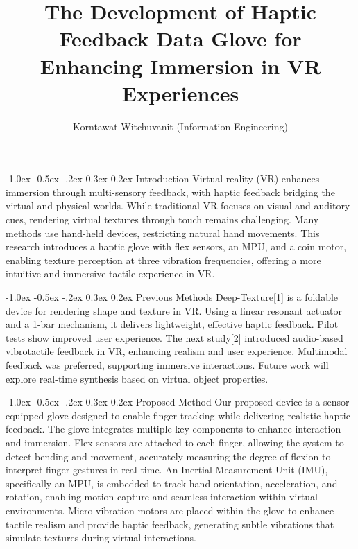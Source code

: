 \documentclass[a4paper,twocolumn]{article}
\title{\textbf{The Development of Haptic Feedback Data Glove for Enhancing Immersion in VR Experiences}}
\author{\small{Korntawat Witchuvanit (Information Engineering)}}
\date{\vspace{-3em}}
\begin{document}
\small
\maketitle

\makeatletter
\renewcommand\section{\@startsection{section}{1}{\z@}%
  {-1.0ex \@plus -0.5ex \@minus -.2ex}%
  {0.3ex \@plus 0.2ex}%
  {\normalfont\small\bfseries}}
\makeatother



\section{Introduction}
Virtual reality (VR) enhances immersion through multi-sensory feedback, with haptic feedback bridging the virtual and physical worlds. While traditional VR focuses on visual and auditory cues, rendering virtual textures through touch remains challenging. Many methods use hand-held devices, restricting natural hand movements. This research introduces a haptic glove with flex sensors, an MPU, and a coin motor, enabling texture perception at three vibration frequencies, offering a more intuitive and immersive tactile experience in VR.

\section{Previous Methods}
Deep-Texture[1] is a foldable device for rendering shape and texture in VR. Using a linear resonant actuator and a 1-bar mechanism, it delivers lightweight, effective haptic feedback. Pilot tests show improved user experience. The next study[2] introduced audio-based vibrotactile feedback in VR, enhancing realism and user experience. Multimodal feedback was preferred, supporting immersive interactions. Future work will explore real-time synthesis based on virtual object properties.

\section{Proposed Method}
Our proposed device is a sensor-equipped glove designed to enable finger tracking while delivering realistic haptic feedback. The glove integrates multiple key components to enhance interaction and immersion. Flex sensors are attached to each finger, allowing the system to detect bending and movement, accurately measuring the degree of flexion to interpret finger gestures in real time. An Inertial Measurement Unit (IMU), specifically an MPU, is embedded to track hand orientation, acceleration, and rotation, enabling motion capture and seamless interaction within virtual environments. Micro-vibration motors are placed within the glove to enhance tactile realism and provide haptic feedback, generating subtle vibrations that simulate textures during virtual interactions.
\end{document}
